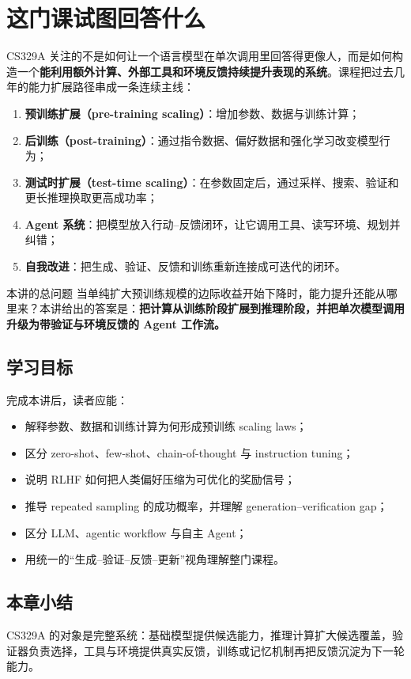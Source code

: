 \section{这门课试图回答什么}

CS329A 关注的不是如何让一个语言模型在单次调用里回答得更像人，而是如何构造一个\textbf{能利用额外计算、外部工具和环境反馈持续提升表现的系统}。课程把过去几年的能力扩展路径串成一条连续主线：

\begin{enumerate}
    \item \textbf{预训练扩展（pre-training scaling）}：增加参数、数据与训练计算；
    \item \textbf{后训练（post-training）}：通过指令数据、偏好数据和强化学习改变模型行为；
    \item \textbf{测试时扩展（test-time scaling）}：在参数固定后，通过采样、搜索、验证和更长推理换取更高成功率；
    \item \textbf{Agent 系统}：把模型放入行动--反馈闭环，让它调用工具、读写环境、规划并纠错；
    \item \textbf{自我改进}：把生成、验证、反馈和训练重新连接成可迭代的闭环。
\end{enumerate}

\begin{importantbox}{本讲的总问题}
当单纯扩大预训练规模的边际收益开始下降时，能力提升还能从哪里来？本讲给出的答案是：\textbf{把计算从训练阶段扩展到推理阶段，并把单次模型调用升级为带验证与环境反馈的 Agent 工作流。}
\end{importantbox}

\subsection{学习目标}

完成本讲后，读者应能：

\begin{itemize}
    \item 解释参数、数据和训练计算为何形成预训练 scaling laws；
    \item 区分 zero-shot、few-shot、chain-of-thought 与 instruction tuning；
    \item 说明 RLHF 如何把人类偏好压缩为可优化的奖励信号；
    \item 推导 repeated sampling 的成功概率，并理解 generation--verification gap；
    \item 区分 LLM、agentic workflow 与自主 Agent；
    \item 用统一的“生成--验证--反馈--更新”视角理解整门课程。
\end{itemize}

\subsection{本章小结}

CS329A 的对象是完整系统：基础模型提供候选能力，推理计算扩大候选覆盖，验证器负责选择，工具与环境提供真实反馈，训练或记忆机制再把反馈沉淀为下一轮能力。

